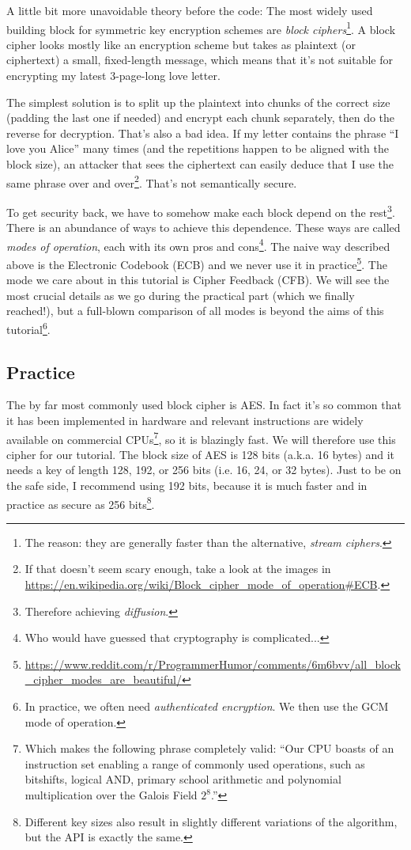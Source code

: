 \documentclass[a4paper,11pt]{article}
\begin{document}
    A little bit more unavoidable theory before the code: The most widely used
    building block for symmetric key encryption schemes are \emph{block
    ciphers}\footnote{The reason: they are generally faster than the
    alternative, \emph{stream ciphers}.}. A block cipher looks mostly like an
    encryption scheme but takes as plaintext (or ciphertext) a small,
    fixed-length message, which means that it's not suitable for encrypting my
    latest 3-page-long love letter.

    The simplest solution is to split up the plaintext into chunks of the
    correct size (padding the last one if needed) and encrypt each chunk
    separately, then do the reverse for decryption. That's also a bad idea. If
    my letter contains the phrase ``I love you Alice'' many times (and the
    repetitions happen to be aligned with the block size), an attacker that sees
    the ciphertext can easily deduce that I use the same phrase over and
    over\footnote{If that doesn't seem scary enough, take a look at the images
    in \url{https://en.wikipedia.org/wiki/Block_cipher_mode_of_operation#ECB}.}.
    That's not semantically secure.

    To get security back, we have to somehow make each block depend on the
    rest\footnote{Therefore achieving \emph{diffusion}.}. There is an abundance
    of ways to achieve this dependence. These ways are called \emph{modes of
    operation}, each with its own pros and cons\footnote{Who would have guessed
    that cryptography is complicated...}. The naive way described above is the
    Electronic Codebook (ECB) and we never use it in
    practice\footnote{\url{https://www.reddit.com/r/ProgrammerHumor/comments/6m6bvv/all_block_cipher_modes_are_beautiful/}}.
    The mode we care about in this tutorial is Cipher Feedback (CFB). We will
    see the most crucial details as we go during the practical part (which we
    finally reached!), but a full-blown comparison of all modes is beyond the
    aims of this tutorial\footnote{In practice, we often need
    \emph{authenticated encryption}. We then use the GCM mode of operation.}.

  \subsection{Practice}
    The by far most commonly used block cipher is AES. In fact it's so common
    that it has been implemented in hardware and relevant instructions are
    widely available on commercial CPUs\footnote{Which makes the following
    phrase completely valid: ``Our CPU boasts of an instruction set enabling a
    range of commonly used operations, such as bitshifts, logical AND, primary
    school arithmetic and polynomial multiplication over the Galois Field
    $2^8$.''}, so it is blazingly fast. We will therefore use this cipher for
    our tutorial. The block size of AES is 128 bits (a.k.a. 16 bytes) and it
    needs a key of length 128, 192, or 256 bits (i.e. 16, 24, or 32 bytes). Just
    to be on the safe side, I recommend using 192 bits, because it is much
    faster and in practice as secure as 256 bits\footnote{Different key sizes
    also result in slightly different variations of the algorithm, but the API
    is exactly the same.}.
\end{document}
